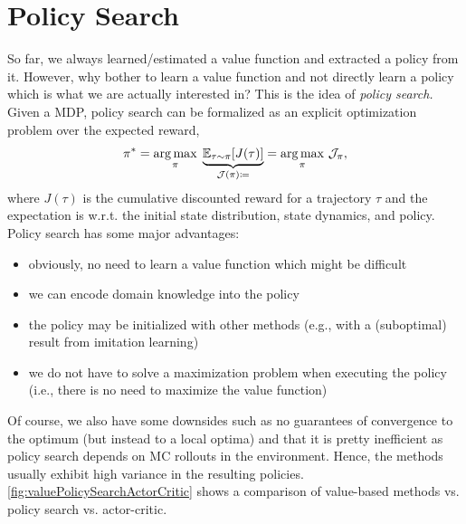 \chapter{Policy Search}
	So far, we always learned/estimated a value function and extracted a policy from it. However, why bother to learn a value function and not directly learn a policy which is what we are actually interested in? This is the idea of \emph{policy search.} Given a \ac{MDP}, policy search can be formalized as an explicit optimization problem over the expected reward,
	\begin{equation}
		\pi^\ast
			= \operatorname*{arg\,max}_\pi \; \underbrace{\mathbb{E}_{\tau \sim \pi}[J(\tau)]}_{\mathcal{J}(\pi) \coloneqq}
			= \operatorname*{arg\,max}_\pi \, \mathcal{J}_\pi,
		\label{eq:policySearchOptPart}
	\end{equation}
	where \(J(\tau)\) is the cumulative discounted reward for a trajectory \(\tau\) and the expectation is w.r.t. the initial state distribution, state dynamics, and policy. Policy search has some major advantages:
	\begin{itemize}
		\item obviously, no need to learn a value function which might be difficult
		\item we can encode domain knowledge into the policy
		\item the policy may be initialized with other methods (e.g., with a (suboptimal) result from imitation learning)
		\item we do not have to solve a maximization problem when executing the policy (i.e., there is no need to maximize the value function)
	\end{itemize}
	Of course, we also have some downsides such as no guarantees of convergence to the optimum (but instead to a local optima) and that it is pretty inefficient as policy search depends on \ac{MC} rollouts in the environment. Hence, the methods usually exhibit high variance in the resulting policies. \autoref{fig:valuePolicySearchActorCritic} shows a comparison of value-based methods vs. policy search vs. actor-critic.

